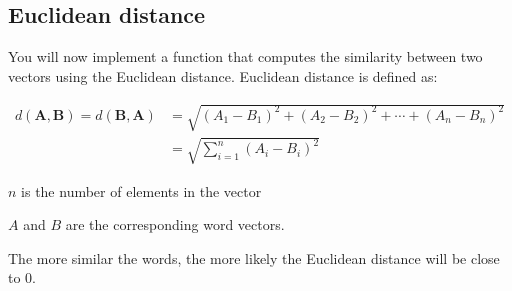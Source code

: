 \documentclass[4apaper,12pt]{book}
\begin{document}
\subsection {Euclidean distance}
\begin{description}
  \item You will now implement a function that computes the similarity between two vectors using the Euclidean distance.
Euclidean distance is defined as:

\item $$ \begin{aligned} d(\mathbf{A}, \mathbf{B})=d(\mathbf{B}, \mathbf{A}) &=\sqrt{\left(A_{1}-B_{1}\right)^{2}+\left(A_{2}-B_{2}\right)^{2}+\cdots+\left(A_{n}-B_{n}\right)^{2}} \\ &=\sqrt{\sum_{i=1}^{n}\left(A_{i}-B_{i}\right)^{2}} \end{aligned}$$

\item $n$ is the number of elements in the vector
\item $A$ and $B$ are the corresponding word vectors.
\item The more similar the words, the more likely the Euclidean distance will be close to 0.
\end{description}
\end{document}
